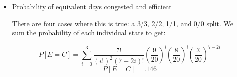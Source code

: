 \begin{enumerate}
\begin{itemize}
      \item Probability of equivalent days congested and efficient

        There are four cases where this is true: a 3/3, 2/2, 1/1, and 0/0 split. We sum the probability of each individual state to get:

        $$P[E=C]=\sum_{i=0}^3\frac{7!}{(i!)^2(7-2i)!}\left(  \frac{9}{20}\right)^i\left( \frac{8}{20} \right)^i\left( \frac{3}{20} \right)^{7-2i}$$
        $$\boxed{P[E=C]=.146}$$

    \end{itemize}

\end{enumerate}




